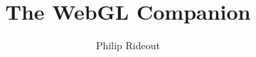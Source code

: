 \documentclass{book}
\title{The WebGL Companion}
\date{}
\author{Philip Rideout}
\begin{document}
\mainmatter


\newcommand{\rrecipe}[1] {\section{\textcolor{mygreen}{#1} } }
\hypersetup{colorlinks,linkcolor=black}
\newcommand{\summary}[1]{\addtocontents{toc}{\setlength{\leftskip}{15pt} \noindent  \footnotesize\textcolor{mygray}{#1}\normalsize\protect\par}}

\let\cleardoublepage\clearpage

\tableofcontents

\newcommand{\definerecipe}[4]
{
	\vspace{0.1in}
	\marginpar { \raggedright \tiny
		\vspace{0.3in}
		#2
	}
	\section{#1} \ \\
	\addcontentsline{toc}{section}{#1}
	\mbox{ \colorbox{bg}{\begin{minipage}{4in}
	\vspace{0.05in}
	\raggedright \Large \textbf{\thesection\ #1} \normalsize
	\vspace{0.05in}
	\setlength\fboxsep{0pt}
	\begin{tabular}{ l p{2.15in} }
	 \vtop{\vspace{0pt}\hbox{\fbox{\texttt{[image: ../media/screenshots/\#3]}} }} &
	 \vtop{\vspace{0pt}\parbox{2.15in}{\noindent\small\textsf{#4} } }\\
	\end{tabular}
	\vspace{0.05in}
	\end{minipage} } }
	\vspace{0.2in}
}













%
%

\backmatter
\renewcommand{\chaptermark}[1]{\markboth{#1}{#1}}

\raggedright

%
%
\printindex
\end{document}
